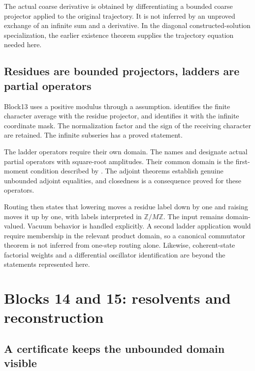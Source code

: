 The actual coarse derivative is obtained by differentiating a bounded coarse projector applied to the original trajectory. It is not inferred by an unproved exchange of an infinite sum and a derivative. In the diagonal constructed-solution specialization, the earlier existence theorem supplies the trajectory equation needed here.

\subsection{Residues are bounded projectors, ladders are partial operators}

Block13 uses a positive modulus through a  assumption.  identifies the finite character average with the residue projector, and  identifies it with the infinite coordinate mask. The normalization factor and the sign of the receiving character are retained. The infinite subseries has a proved  statement.

The ladder operators require their own domain. The names  and  designate actual partial operators with square-root amplitudes. Their common domain is the first-moment condition described by . The adjoint theorems establish genuine unbounded adjoint equalities, and closedness is a consequence proved for these operators.

Routing then states that lowering moves a residue label down by one and raising moves it up by one, with labels interpreted in \(\mathbb Z/M\mathbb Z\). The input remains domain-valued. Vacuum behavior is handled explicitly. A second ladder application would require membership in the relevant product domain, so a canonical commutator theorem is not inferred from one-step routing alone. Likewise, coherent-state factorial weights and a differential oscillator identification are beyond the statements represented here.

\section{Blocks 14 and 15: resolvents and reconstruction}

\subsection{A certificate keeps the unbounded domain visible}

